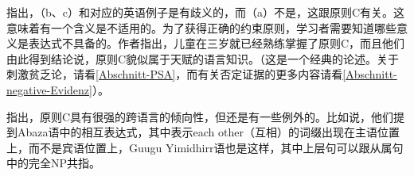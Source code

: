  \citet*[]{CTK2009a} 指出，（b、c）和对应的英语例子是有歧义的，而（a）不是，这跟原则C有关。这意味着有一个含义是不适用的。为了获得正确的约束原则，学习者需要知道哪些意义是表达式不具备的。作者指出，儿童在三岁就已经熟练掌握了原则C，而且他们由此得到结论说，原则C貌似属于天赋的语言知识。（这是一个经典的论述。关于刺激贫乏论，请看\ref{Abschnitt-PSA}，而有关否定证据的更多内容请看\ref{Abschnitt-negative-Evidenz}）。

 \citet[]{EL2009b}指出，原则C具有很强的跨语言的倾向性，但还是有一些例外的。比如说，他们提到Abaza语中的相互表达式，其中表示each other（互相）的词缀出现在主语位置上，而不是宾语位置上，Guugu Yimidhirr语也是这样，其中上层句可以跟从属句中的完全NP共指。

